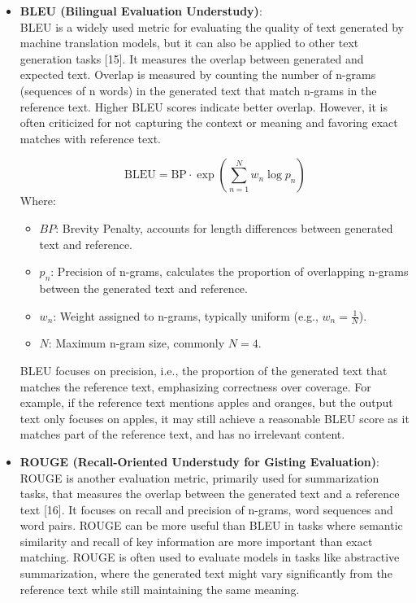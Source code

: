 \documentclass[12pt]{article}
\begin{document}
\begin{itemize}
        \item \textbf{BLEU (Bilingual Evaluation Understudy)}: \\
        BLEU is a widely used metric for evaluating the quality of text generated by machine translation models, but it can also be applied to other text generation tasks [15]. It measures the overlap between generated and expected text. Overlap is measured by counting the number of n-grams (sequences of n words) in the generated text that match n-grams in the reference text. Higher BLEU scores indicate better overlap. However, it is often criticized for not capturing the context or meaning and favoring exact matches with reference text.

        \[
            \text{BLEU} = \text{BP} \cdot \exp\left( \sum_{n=1}^{N} w_n \log p_n \right)
        \]
        Where:
        \begin{itemize}
            \item \(BP\): Brevity Penalty, accounts for length differences between generated text and reference.
            \item \(p_n\): Precision of n-grams, calculates the proportion of overlapping n-grams between the generated text and reference.
            \item \(w_n\): Weight assigned to n-grams, typically uniform (e.g., \(w_n = \frac{1}{N}\)).
            \item \(N\): Maximum n-gram size, commonly \(N = 4\).
        \end{itemize}

        BLEU focuses on precision, i.e., the proportion of the generated text that matches the reference text, emphasizing correctness over coverage. For example, if the reference text mentions apples and oranges, but the output text only focuses on apples, it may still achieve a reasonable BLEU score as it matches part of the reference text, and has no irrelevant content.

        \item \textbf{ROUGE (Recall-Oriented Understudy for Gisting Evaluation)}: \\
        ROUGE is another evaluation metric, primarily used for summarization tasks, that measures the overlap between the generated text and a reference text [16]. It focuses on recall and precision of n-grams, word sequences and word pairs. ROUGE can be more useful than BLEU in tasks where semantic similarity and recall of key information are more important than exact matching. ROUGE is often used to evaluate models in tasks like abstractive summarization, where the generated text might vary significantly from the reference text while still maintaining the same meaning.



\end{itemize}
\end{document}
